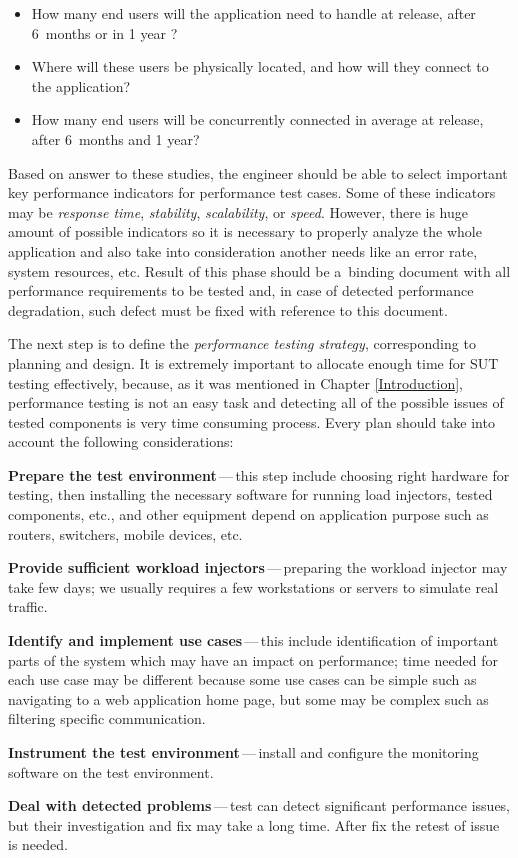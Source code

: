 \begin{itemize}
	\setlength\itemsep{0em}
	\item How many end users will the application need to handle at release, after 6~months or in 1 year ?
	\item Where will these users be physically located, and how will they connect to the application?
	\item How many end users will be concurrently connected in average at release, after 6~months and 1 year?
\end{itemize}

Based on answer to these studies, the engineer should be able to select important key performance indicators for performance test cases. Some of these indicators may be \emph{response time}, \emph{stability}, \emph{scalability}, or \emph{speed}. However, there is huge amount of possible indicators so it is necessary to properly analyze the whole application and also take into consideration another needs like an error rate, system resources, etc.  Result of this phase should be a~binding document with all performance requirements to be tested and, in case of detected performance degradation, such defect must be fixed with reference to this document.

The next step is to define the \emph{performance testing strategy}, corresponding to planning and design. It is extremely important to allocate enough time for SUT testing effectively, because, as it was mentioned in Chapter \ref{Introduction}, performance testing is not an easy task and detecting all of the possible issues of tested components is very time consuming process. Every plan should take into account the following considerations:

\begin{description}
	\setlength\itemsep{0em}
	\item \textbf{Prepare the test environment}\,---\,this step include choosing right hardware for testing, then installing the necessary software for running load injectors, tested components, etc., and other equipment depend on application purpose such as routers, switchers, mobile devices, etc.
	\item \textbf{Provide sufficient workload injectors}\,---\,preparing the workload injector may take few days; we usually requires a few workstations or servers to simulate real traffic.
	\item \textbf{Identify and implement use cases}\,---\,this include identification of important parts of the system which may have an impact on performance; time needed for each use case may be different because some use cases can be simple such as navigating to a web application home page, but some may be complex such as filtering specific communication.
	\item \textbf{Instrument the test environment}\,---\,install and configure the monitoring software on the test environment.
	\item \textbf{Deal with detected problems}\,---\,test can detect significant performance issues, but their investigation and fix may take a long time. After fix the retest of issue is needed.
\end{description}

